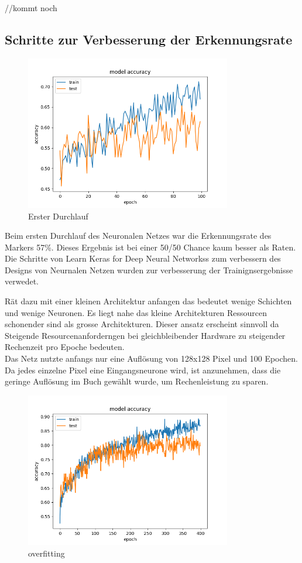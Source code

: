 \documentclass[conference]{IEEEtran}
\begin{document}
	//kommt noch
	\subsection{Schritte zur Verbesserung der Erkennungsrate} %
	
	
	\begin{figure}[!h]
		\centering
		\includegraphics[width=9cm]{img/160x120:100@32_accuracy.png}
		\caption{Erster Durchlauf}
		\label{Initiales Ergebnis}
	\end{figure}
	Beim ersten Durchlauf des Neuronalen Netzes war die Erkennungsrate des Markers 57\%. Dieses Ergebnis ist bei einer 50/50 Chance kaum besser als Raten.\\
	
	Die Schritte von  \glqq Learn Keras for Deep Neural Networkss\grqq \cite{moolayil2019learn} zum verbessern des Designs von Neurnalen Netzen wurden zur verbesserung der Trainignsergebnisse verwedet. 
	
	\cite{moolayil2019learn} Rät dazu mit einer kleinen Architektur anfangen das bedeutet wenige Schichten und wenige Neuronen. Es liegt nahe das kleine Architekturen Ressourcen schonender sind als grosse Architekturen. Dieser ansatz erscheint sinnvoll da Steigende Resourcenanforderngen bei gleichbleibender Hardware zu steigender Rechenzeit pro Epoche bedeuten. \\
	
	Das Netz nutzte anfangs nur eine Auflösung von 128x128 Pixel und 100 Epochen. Da jedes einzelne Pixel eine Eingangsneurone wird, ist anzunehmen, dass die geringe Auflösung im Buch gewählt wurde, um Rechenleistung zu sparen. \\
	
	\begin{figure}[!h]
		\centering
		\includegraphics[width=9cm]{img/213x160:400@32_accuracy.png}
		\caption{overfitting}
		\label{Overfitt }
	\end{figure}
	
\end{document}
